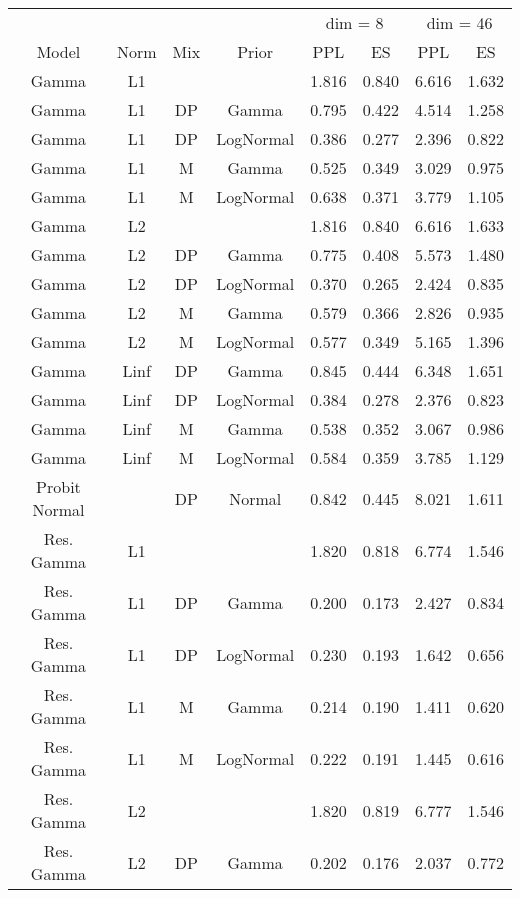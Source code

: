 
\begin{tabular}{cccccccc}
\toprule
\multicolumn{4}{c}{ } & \multicolumn{2}{c}{dim = 8} & \multicolumn{2}{c}{dim = 46} \\
\cmidrule(l{3pt}r{3pt}){5-6} \cmidrule(l{3pt}r{3pt}){7-8}
Model & Norm & Mix & Prior & PPL & ES & PPL & ES\\
\midrule
Gamma & L1 &  &  & 1.816 & 0.840 & 6.616 & 1.632\\
Gamma & L1 & DP & Gamma & 0.795 & 0.422 & 4.514 & 1.258\\
Gamma & L1 & DP & LogNormal & 0.386 & 0.277 & 2.396 & 0.822\\
Gamma & L1 & M & Gamma & 0.525 & 0.349 & 3.029 & 0.975\\
Gamma & L1 & M & LogNormal & 0.638 & 0.371 & 3.779 & 1.105\\
\addlinespace
Gamma & L2 &  &  & 1.816 & 0.840 & 6.616 & 1.633\\
Gamma & L2 & DP & Gamma & 0.775 & 0.408 & 5.573 & 1.480\\
Gamma & L2 & DP & LogNormal & 0.370 & 0.265 & 2.424 & 0.835\\
Gamma & L2 & M & Gamma & 0.579 & 0.366 & 2.826 & 0.935\\
Gamma & L2 & M & LogNormal & 0.577 & 0.349 & 5.165 & 1.396\\
\addlinespace
Gamma & Linf & DP & Gamma & 0.845 & 0.444 & 6.348 & 1.651\\
Gamma & Linf & DP & LogNormal & 0.384 & 0.278 & 2.376 & 0.823\\
Gamma & Linf & M & Gamma & 0.538 & 0.352 & 3.067 & 0.986\\
Gamma & Linf & M & LogNormal & 0.584 & 0.359 & 3.785 & 1.129\\
Probit Normal &  & DP & Normal & 0.842 & 0.445 & 8.021 & 1.611\\
\addlinespace
Res. Gamma & L1 &  &  & 1.820 & 0.818 & 6.774 & 1.546\\
Res. Gamma & L1 & DP & Gamma & 0.200 & 0.173 & 2.427 & 0.834\\
Res. Gamma & L1 & DP & LogNormal & 0.230 & 0.193 & 1.642 & 0.656\\
Res. Gamma & L1 & M & Gamma & 0.214 & 0.190 & 1.411 & 0.620\\
Res. Gamma & L1 & M & LogNormal & 0.222 & 0.191 & 1.445 & 0.616\\
\addlinespace
Res. Gamma & L2 &  &  & 1.820 & 0.819 & 6.777 & 1.546\\
Res. Gamma & L2 & DP & Gamma & 0.202 & 0.176 & 2.037 & 0.772\\

\end{tabular}
